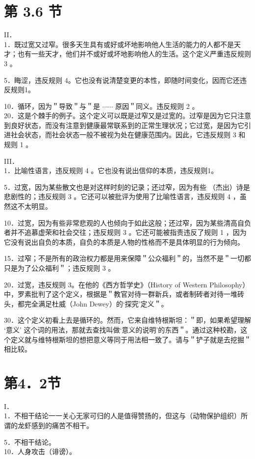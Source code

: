\section*{第 3.6 节}
II．\\
1．既过宽又过窄。很多天生具有或好或坏地影响他人生活的能力的人都不是天才；也有一些天才，他们并不或好或坏地影响他人的生活。这个定义严重违反规则 3 。

5．䀲涩，违反规则 4。它也没有说清楚变更的本性，即随时间变化，因而它还违反规则1。

10．循环，因为＂导致＂与＂是 $\cdots \cdots$ 原因＂同义。违反规则 2 。\\
20．这是个棘手的例子。这个定义可以既是过窄又是过宽的。过窄是因为它只注意到良好状态，而没有注意到健康最常联系到的正常生理状况；它过宽，是因为它引进社会状态，而社会状态一般不被视为处在健康范围内。因此，它违反规则 3 和规则 1 。

III．\\
1．比喻性语言，违反规则 4 。它也没有说出信仰的本质，违反规则1。

5．过宽，因为某些散文也是对这样时刻的记录；还过窄，因为有些 （杰出）诗是悲剧性的；违反规则 3 。它还可以被批评为使用了比喻性语言，违反规则 4 ，虽然这不太明显。

10．过宽，因为有些非常悲观的人也倾向于如此这般；还过窄，因为某些清高自负者并不追慕虚荣和社会交往；违反规则 3 。它还可能被指责违反了规则 1 ，因为它没有说出自负的本质，自负的本质是人物的性格而不是具体明显的行为倾向。

15．过窄；不是所有的政治权力都是用来保障＂公众福利＂的，当然不是＂一切都只是为了公众福利＂；违反规则 3 。

20．过宽，违反规则 3。在他的《西方哲学史》（History of Western Philosophy）中，罗素批判了这个定义，根据是＂教官对待一群新兵，或者制砖者对待一堆砖头，都完全满足杜威（John Dewey）的‘探究’定义＂。

30．这个定义初看上去是循环的。然而，它来自维特根斯坦：＂即，如果希望理解 ‘意义’ 这个词的用法，那就去查找叫做‘意义的说明’的东西＂。通过这种校勘，这个定义就与维特根斯坦的想把意义等同于用法相一致了。请与＂铲子就是去挖掘＂相比较。

\section*{第4．2节}
I．\\
1．不相干结论一一关心无家可归的人是值得赞扬的，但这与（动物保护组织）所谓的龙虾感到的痛苦不相干。

5．不相干结论。\\
10．人身攻击（诽谤）。

